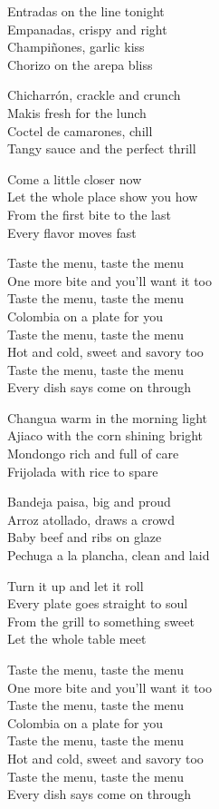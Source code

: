 \begin{lyrics}
Entradas on the line tonight\\
Empanadas, crispy and right\\
Champiñones, garlic kiss\\
Chorizo on the arepa bliss

Chicharrón, crackle and crunch\\
Makis fresh for the lunch\\
Coctel de camarones, chill\\
Tangy sauce and the perfect thrill

Come a little closer now\\
Let the whole place show you how\\
From the first bite to the last\\
Every flavor moves fast

Taste the menu, taste the menu\\
One more bite and you’ll want it too\\
Taste the menu, taste the menu\\
Colombia on a plate for you\\
Taste the menu, taste the menu\\
Hot and cold, sweet and savory too\\
Taste the menu, taste the menu\\
Every dish says come on through

Changua warm in the morning light\\
Ajiaco with the corn shining bright\\
Mondongo rich and full of care\\
Frijolada with rice to spare

Bandeja paisa, big and proud\\
Arroz atollado, draws a crowd\\
Baby beef and ribs on glaze\\
Pechuga a la plancha, clean and laid

Turn it up and let it roll\\
Every plate goes straight to soul\\
From the grill to something sweet\\
Let the whole table meet

Taste the menu, taste the menu\\
One more bite and you’ll want it too\\
Taste the menu, taste the menu\\
Colombia on a plate for you\\
Taste the menu, taste the menu\\
Hot and cold, sweet and savory too\\
Taste the menu, taste the menu\\
Every dish says come on through


\end{lyrics}
